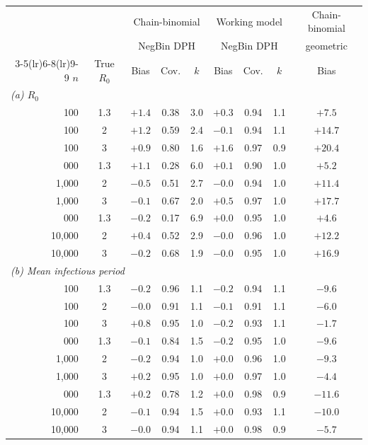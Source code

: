 \begin{tabular}{r c ccc ccc c}
\toprule
& & \multicolumn{3}{c}{Chain-binomial} & \multicolumn{3}{c}{Working model} & Chain-binomial \\
& & \multicolumn{3}{c}{NegBin DPH} & \multicolumn{3}{c}{NegBin DPH} & geometric \\
\cmidrule(lr){3-5}\cmidrule(lr){6-8}\cmidrule(lr){9-9}
$n$ & True $R_0$ & Bias & Cov. & $k$ & Bias & Cov. & $k$ & Bias \\
\midrule
\multicolumn{9}{l}{\textit{(a) $R_0$}} \\
100 & 1.3 & ${+}1.4$ & 0.38 & 3.0 & ${+}0.3$ & 0.94 & 1.1 & ${+}7.5$ \\
100 & 2 & ${+}1.2$ & 0.59 & 2.4 & $-0.1$ & 0.94 & 1.1 & ${+}14.7$ \\
100 & 3 & ${+}0.9$ & 0.80 & 1.6 & ${+}1.6$ & 0.97 & 0.9 & ${+}20.4$ \\
\addlinespace
1{,}000 & 1.3 & ${+}1.1$ & 0.28 & 6.0 & ${+}0.1$ & 0.90 & 1.0 & ${+}5.2$ \\
1{,}000 & 2 & $-0.5$ & 0.51 & 2.7 & $-0.0$ & 0.94 & 1.0 & ${+}11.4$ \\
1{,}000 & 3 & $-0.1$ & 0.67 & 2.0 & ${+}0.5$ & 0.97 & 1.0 & ${+}17.7$ \\
\addlinespace
10{,}000 & 1.3 & $-0.2$ & 0.17 & 6.9 & ${+}0.0$ & 0.95 & 1.0 & ${+}4.6$ \\
10{,}000 & 2 & ${+}0.4$ & 0.52 & 2.9 & $-0.0$ & 0.96 & 1.0 & ${+}12.2$ \\
10{,}000 & 3 & $-0.2$ & 0.68 & 1.9 & $-0.0$ & 0.95 & 1.0 & ${+}16.9$ \\
\midrule
\multicolumn{9}{l}{\textit{(b) Mean infectious period}} \\
100 & 1.3 & $-0.2$ & 0.96 & 1.1 & $-0.2$ & 0.94 & 1.1 & $-9.6$ \\
100 & 2 & $-0.0$ & 0.91 & 1.1 & $-0.1$ & 0.91 & 1.1 & $-6.0$ \\
100 & 3 & ${+}0.8$ & 0.95 & 1.0 & $-0.2$ & 0.93 & 1.1 & $-1.7$ \\
\addlinespace
1{,}000 & 1.3 & $-0.1$ & 0.84 & 1.5 & $-0.2$ & 0.95 & 1.0 & $-9.6$ \\
1{,}000 & 2 & $-0.2$ & 0.94 & 1.0 & ${+}0.0$ & 0.96 & 1.0 & $-9.3$ \\
1{,}000 & 3 & ${+}0.2$ & 0.95 & 1.0 & ${+}0.0$ & 0.97 & 1.0 & $-4.4$ \\
\addlinespace
10{,}000 & 1.3 & ${+}0.2$ & 0.78 & 1.2 & ${+}0.0$ & 0.98 & 0.9 & $-11.6$ \\
10{,}000 & 2 & $-0.1$ & 0.94 & 1.5 & ${+}0.0$ & 0.93 & 1.1 & $-10.0$ \\
10{,}000 & 3 & $-0.0$ & 0.94 & 1.1 & ${+}0.0$ & 0.98 & 0.9 & $-5.7$ \\
\bottomrule
\end{tabular}
